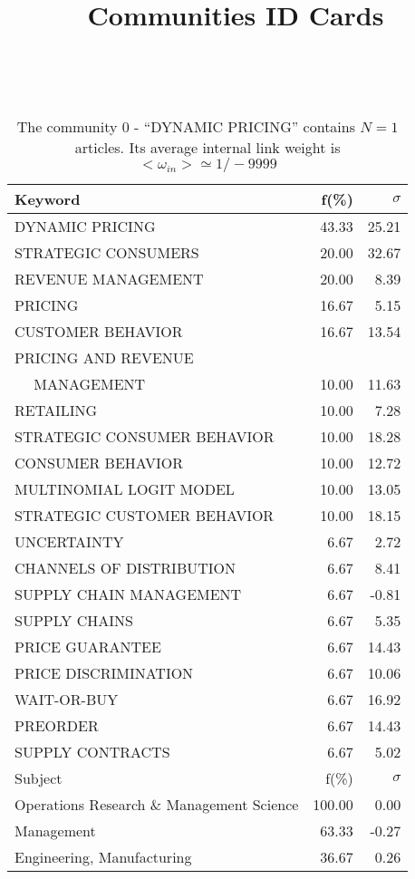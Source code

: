 \documentclass[a4paper,11pt]{report}
\title{{\bf Communities ID Cards}}
\date{\begin{flushleft}This document gather the ``ID Cards'' of the CC communities found within your database.\\
 The CC network was built by keeping a link between articles sharing at least 10 references. The communities characterized here correspond to the ones found in the level 0 (in the sense of the Louvain algo) which gathers more than 0 articles.\\
 These ID cards displays the most frequent keywords, subject categories, journals of publication, institution, countries, authors, references and reference journals of the articles of each community. The significance of an item $\sigma = \sqrt{N} (f - p) / \sqrt{p(1-p)}$ [where $N$ is the number of articles within the community and $f$ and $p$ are the proportion of articles respectively within the community and within the database displaying that item ] is also given (for example $\sigma > 5$ is really highly significant).\\
\vspace{1cm}
\copyright Sebastian Grauwin, Liu Weizhi - (2014) \end{flushleft}}
\begin{document}
\begin{landscape}
\maketitle
\clearpage

\begin{table}[!ht]
\caption{The community 0 - ``DYNAMIC PRICING'' contains $N = 1$ articles. Its average internal link weight is $<\omega_{in}> \simeq 1/-9999$ }
\textcolor{white}{aa}\\
{\scriptsize\begin{tabular}{|l r r|}
\hline
Keyword & f(\%) & $\sigma$\\
\hline
DYNAMIC PRICING & 43.33 & 25.21\\
STRATEGIC CONSUMERS & 20.00 & 32.67\\
REVENUE MANAGEMENT & 20.00 & 8.39\\
PRICING & 16.67 & 5.15\\
CUSTOMER BEHAVIOR & 16.67 & 13.54\\
PRICING AND REVENUE &  & \\
$\quad$ MANAGEMENT & 10.00 & 11.63\\
RETAILING & 10.00 & 7.28\\
STRATEGIC CONSUMER BEHAVIOR & 10.00 & 18.28\\
CONSUMER BEHAVIOR & 10.00 & 12.72\\
MULTINOMIAL LOGIT MODEL & 10.00 & 13.05\\
STRATEGIC CUSTOMER BEHAVIOR & 10.00 & 18.15\\
UNCERTAINTY & 6.67 & 2.72\\
CHANNELS OF DISTRIBUTION & 6.67 & 8.41\\
SUPPLY CHAIN MANAGEMENT & 6.67 & -0.81\\
SUPPLY CHAINS & 6.67 & 5.35\\
PRICE GUARANTEE & 6.67 & 14.43\\
PRICE DISCRIMINATION & 6.67 & 10.06\\
WAIT-OR-BUY & 6.67 & 16.92\\
PREORDER & 6.67 & 14.43\\
SUPPLY CONTRACTS & 6.67 & 5.02\\
\hline
\hline
Subject & f(\%) & $\sigma$\\
\hline
Operations Research \& Management Science & 100.00 & 0.00\\
Management & 63.33 & -0.27\\
Engineering, Manufacturing & 36.67 & 0.26\\

\end{tabular}}
\end{table}
\end{landscape}
\end{document}
